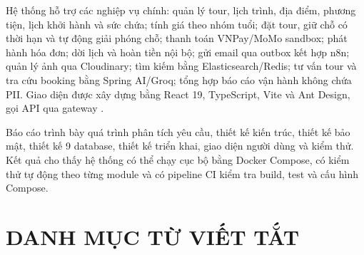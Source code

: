 Hệ thống hỗ trợ các nghiệp vụ chính: quản lý tour, lịch trình, địa điểm, phương tiện, lịch khởi hành và sức chứa; tính giá theo nhóm tuổi; đặt tour, giữ chỗ có thời hạn và tự động giải phóng chỗ; thanh toán VNPay/MoMo sandbox; phát hành hóa đơn; dời lịch và hoàn tiền nội bộ; gửi email qua outbox kết hợp n8n; quản lý ảnh qua Cloudinary; tìm kiếm bằng Elasticsearch/Redis; tư vấn tour và tra cứu booking bằng Spring AI/Groq; tổng hợp báo cáo vận hành không chứa PII. Giao diện được xây dựng bằng React 19, TypeScript, Vite và Ant Design, gọi API qua gateway .

Báo cáo trình bày quá trình phân tích yêu cầu, thiết kế kiến trúc, thiết kế bảo mật, thiết kế 9 database, thiết kế triển khai, giao diện người dùng và kiểm thử. Kết quả cho thấy hệ thống có thể chạy cục bộ bằng Docker Compose, có kiểm thử tự động theo từng module và có pipeline CI kiểm tra build, test và cấu hình Compose.

\clearpage
\tableofcontents
\clearpage
\listoffigures
\clearpage
\listoftables
\clearpage

\chapter*{DANH MỤC TỪ VIẾT TẮT}

